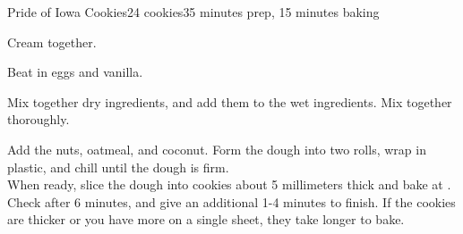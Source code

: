 \documentclass[../Cookbook.tex]{subfiles}
\begin{document}
\begin{recipe}{Pride of Iowa Cookies}{24 cookies}{35 minutes prep, 15 minutes baking}

	Cream together.

	Beat in eggs and vanilla.

	Mix together dry ingredients, and add them to the wet ingredients. Mix together thoroughly.

	Add the nuts, oatmeal, and coconut. Form the dough into two rolls, wrap in plastic, and chill until the dough is firm.\\
	When ready, slice the dough into cookies about 5 millimeters thick and bake at . Check after 6 minutes, and give an additional 1-4 minutes to finish. If the cookies are thicker or you have more on a single sheet, they take longer to bake.

\end{recipe}
\end{document}
